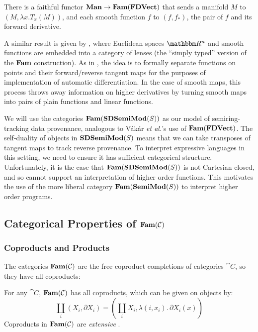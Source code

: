 \begin{proposition}
  \label{prop:embed-manifolds}
  There is a faithful functor $\mathbf{Man} \to \mathbf{Fam}(\mathbf{FDVect})$ that sends a
  manifold $M$ to $(M, \lambda x. T_x(M))$, and each smooth function
  $f$ to $(f, f_*)$, the pair of $f$ and its forward derivative.
\end{proposition}

A similar result is given by \citet{cruttwell2022}, where Euclidean
spaces $\RR^n$ and smooth functions are embedded into a category of
lenses (the ``simply typed'' version of the $\mathbf{Fam}$ construction). As
in \citet{vakar22}, the idea is to formally separate functions on
points and their forward/reverse tangent maps for the purposes of
implementation of automatic differentiation. In the case of smooth
maps, this process throws away information on higher derivatives by
turning smooth maps into pairs of plain functions and linear
functions.

We will use the categories $\mathbf{Fam}(\mathbf{SDSemiMod}(S))$ as our model
  of semiring-tracking data provenance, analogous to V{\'a}k{\'a}r
  \emph{et al.}'s use of $\mathbf{Fam}(\mathbf{FDVect})$. The self-duality of objects
  in $\mathbf{SDSemiMod}(S)$ means that we can take transposes of tangent maps
  to track reverse provenance. To interpret expressive languages in
  this setting, we need to ensure it has sufficient categorical
  structure. Unfortunately, it is the case that $\mathbf{Fam}(\mathbf{SDSemiMod}(S))$
  is not Cartesian closed, and so cannot support an interpretation of
  higher order functions. This motivates the use of the more liberal
  category $\mathbf{Fam}(\mathbf{SemiMod}(S))$ to interpret higher order programs.

\subsection{Categorical Properties of $\mathbf{Fam}(\mathcal{C})$}

\subsubsection{Coproducts and Products}
\label{sec:models-of-total-gps:coproducts-and-products}

The categories $\mathbf{Fam}(\mathcal{C})$ are the free coproduct completions of
categories $\cat{C}$, so they have all coproducts:

\begin{proposition}
  For any $\cat{C}$, $\mathbf{Fam}(\mathcal{C})$ has all coproducts, which can be
  given on objects by:
  \begin{displaymath}
    \coprod_i (X_i, \partial X_i) = (\coprod_i X_i, \lambda (i, x_i).\, \partial X_i(x))
  \end{displaymath}
  Coproducts in $\mathbf{Fam}(\mathcal{C})$ are \emph{extensive}
  \cite[Proposition 2.4]{carboni-lack-walters93}.
\end{proposition}

